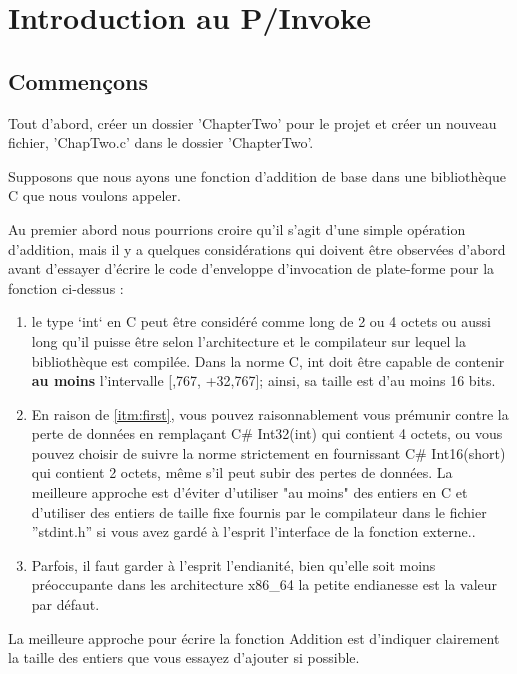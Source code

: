 \chapter{Introduction au P/Invoke}

\section{Commençons}
Tout d'abord, créer un dossier 'ChapterTwo' pour le projet et créer un nouveau fichier, 'ChapTwo.c' dans le dossier 'ChapterTwo'.

Supposons que nous ayons une fonction d’addition de base dans une bibliothèque C que nous voulons appeler.



Au premier abord nous pourrions croire qu'il s'agit d'une simple opération d'addition, mais il y a quelques considérations qui doivent être observées d'abord avant d'essayer d'écrire le code d'enveloppe d'invocation de plate-forme pour la fonction ci-dessus :

\begin{enumerate}
	\item \label{itm:first} le type `int` en C peut être considéré comme long de 2 ou 4 octets ou aussi long qu'il puisse être selon l'architecture et le compilateur sur lequel la bibliothèque est compilée. Dans la norme C, int doit être capable de contenir \textbf{au moins} l'intervalle [,767, +32,767]; ainsi, sa taille est d'au moins 16 bits.
	
	\item En raison de \ref{itm:first}, vous pouvez raisonnablement vous prémunir contre la perte de données en remplaçant C\# Int32(int) qui contient 4 octets, ou vous pouvez choisir de suivre la norme strictement en fournissant C\# Int16(short) qui contient 2 octets, même s'il peut subir des pertes de données. La meilleure approche est d'éviter d'utiliser "au moins" des entiers en C et d'utiliser des entiers de taille fixe fournis par le compilateur dans le fichier ''stdint.h'' si vous avez gardé à l'esprit l'interface de la fonction externe..
	
	\item Parfois, il faut garder à l'esprit l'endianité, bien qu'elle soit moins préoccupante dans les architecture x86\_64 la petite endianesse est la valeur par défaut.
\end{enumerate}
La meilleure approche pour écrire la fonction Addition est d'indiquer clairement la taille des entiers que vous essayez d'ajouter si possible.

